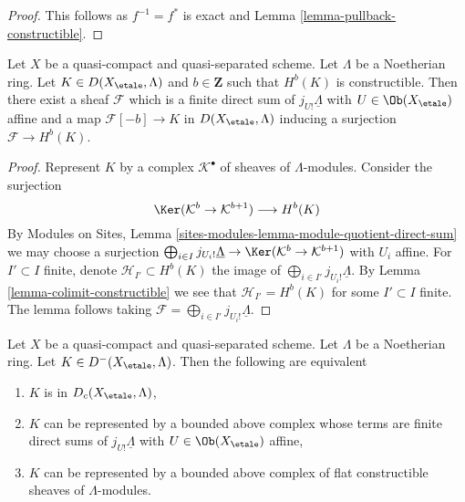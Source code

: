 \begin{proof}
This follows as $f^{-1} = f^*$ is exact and
Lemma \ref{lemma-pullback-constructible}.
\end{proof}

\begin{lemma}
\label{lemma-one-constructible}
Let $X$ be a quasi-compact and quasi-separated scheme.
Let $\Lambda$ be a Noetherian ring. Let $K \in D(X_\etale, \Lambda)$
and $b \in \mathbf{Z}$ such that $H^b(K)$ is constructible.
Then there exist a sheaf $\mathcal{F}$ which is a finite direct sum
of $j_{U!}\underline{\Lambda}$ with $U \in \Ob(X_\etale)$ affine and
a map $\mathcal{F}[-b] \to K$ in $D(X_\etale, \Lambda)$
inducing a surjection $\mathcal{F} \to H^b(K)$.
\end{lemma}

\begin{proof}
Represent $K$ by a complex $\mathcal{K}^\bullet$ of sheaves of
$\Lambda$-modules. Consider the surjection
$$
\Ker(\mathcal{K}^b \to \mathcal{K}^{b + 1})
\longrightarrow
H^b(K)
$$
By Modules on Sites, Lemma
\ref{sites-modules-lemma-module-quotient-direct-sum}
we may choose a surjection
$\bigoplus_{i \in I} j_{U_i!} \underline{\Lambda} \to
\Ker(\mathcal{K}^b \to \mathcal{K}^{b + 1})$
with $U_i$ affine. For $I' \subset I$ finite, denote
$\mathcal{H}_{I'} \subset H^b(K)$ the image of
$\bigoplus_{i \in I'} j_{U_i!} \underline{\Lambda}$. By
Lemma \ref{lemma-colimit-constructible}
we see that $\mathcal{H}_{I'} = H^b(K)$ for some $I' \subset I$ finite.
The lemma follows taking
$\mathcal{F} = \bigoplus_{i \in I'} j_{U_i!} \underline{\Lambda}$.
\end{proof}

\begin{lemma}
\label{lemma-bounded-above-c}
Let $X$ be a quasi-compact and quasi-separated scheme.
Let $\Lambda$ be a Noetherian ring. Let $K \in D^-(X_\etale, \Lambda)$. Then
the following are equivalent
\begin{enumerate}
\item $K$ is in $D_c(X_\etale, \Lambda)$,
\item $K$ can be represented by a bounded above complex
whose terms are finite direct sums of $j_{U!}\underline{\Lambda}$
with $U \in \Ob(X_\etale)$ affine,
\item $K$ can be represented by a bounded above complex
of flat constructible sheaves of $\Lambda$-modules.
\end{enumerate}
\end{lemma}

